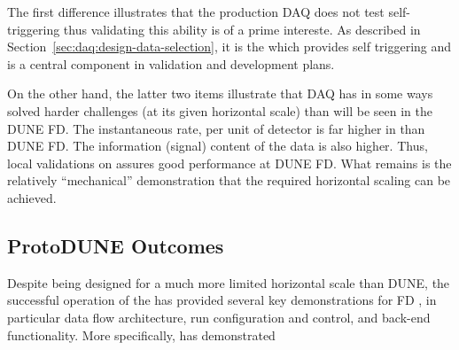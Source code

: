 The first difference illustrates that the production 
DAQ does not test self-triggering thus validating this ability is of a
prime intereste.
As described in Section~\ref{sec:daq:design-data-selection}, it is the
 which provides self triggering and is a central component
in validation and development plans.
 
On the other hand, the latter two items illustrate that
 DAQ has in some ways solved harder challenges (at its
given horizontal scale) than will be seen in the DUNE FD. 
The instantaneous rate, per unit of detector is far higher in
 than DUNE FD. 
The information (signal) content of the data is also higher. 
Thus, local validations on  assures good performance at
DUNE FD. 
What remains is the relatively ``mechanical'' demonstration that the
required horizontal scaling can be achieved.  

\subsection{ProtoDUNE Outcomes}

Despite being designed for a much more limited horizontal scale than
DUNE, the successful operation of the   has
provided several key demonstrations for  FD , in
particular data flow architecture, run configuration and control, and
back-end functionality.
More specifically,  has demonstrated


